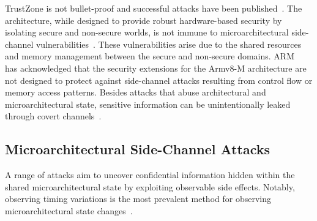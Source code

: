 TrustZone is not bullet-proof and successful attacks have been
published~\cite{DemystifyingAT, surveyonTEE,
returntononsecure}. The architecture, while designed to provide robust
hardware-based security by isolating secure and non-secure worlds, is not
immune to microarchitectural side-channel
vulnerabilities~\cite{DemystifyingAT, busted, surveyonTEE, truspy,
Bypassed}. These vulnerabilities arise due to the shared resources and
memory management between the secure and non-secure domains.
ARM~\cite{armdeveloper} has acknowledged that the security extensions for
the Armv8-M architecture are not designed to protect against side-channel
attacks resulting from control flow or memory access patterns.
Besides attacks that abuse architectural and microarchitectural state,
sensitive information can be unintentionally leaked through covert
channels~\cite{storagechannel, sabelfeld}.

\subsection{Microarchitectural Side-Channel Attacks}

A range of attacks aim to uncover confidential information hidden within
the shared microarchitectural state by
exploiting observable side effects. Notably, observing timing variations
is the most prevalent method for observing microarchitectural state
changes~\cite{vanbulckphdthesis}.

